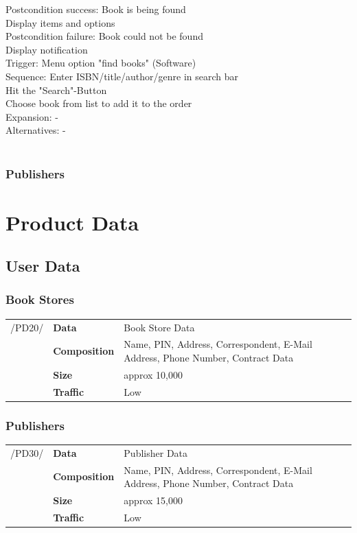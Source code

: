 \documentclass[11pt,a4paper,oneside,svgnames]{report}
\begin{document}
\begin{tabbing}
	 Postcondition success: \> Book is being found\\
	 \> Display items and options\\
	 Postcondition failure: \> Book could not be found\\
	 \> Display notification\\
	 Trigger: \> Menu option "find books" (Software)\\
	 Sequence: \> Enter ISBN/title/author/genre in search bar\\
	 \> Hit the "Search"-Button\\
	 \> Choose book from list to add it to the order\\
	 Expansion: \> -\\
	 Alternatives: \> -\\
	 \\
\end{tabbing} 
\clearpage

\subsection{Publishers}

\chapter{Product Data}
\section{User Data}
\subsection{Book Stores}

\begin{tabular}{llp{10cm}}
\cellcolor{white}/PD20/	& \textbf{Data}			& Book Store Data\\
\cellcolor{white}		& \textbf{Composition}	& Name, PIN, Address, Correspondent, E-Mail Address, Phone Number, Contract Data\\
\cellcolor{white}		& \textbf{Size}		& approx 10,000\\
\cellcolor{white}		& \textbf{Traffic}		& Low\\
\end{tabular} 
\subsection{Publishers}
\begin{tabular}{llp{10cm}}
\cellcolor{white}/PD30/	& \textbf{Data}			& Publisher Data\\
\cellcolor{white}		& \textbf{Composition}	& Name, PIN, Address, Correspondent, E-Mail Address, Phone Number, Contract Data\\
\cellcolor{white}		& \textbf{Size}		& approx 15,000\\
\cellcolor{white}		& \textbf{Traffic}		& Low\\
\end{tabular} 
\end{document}
